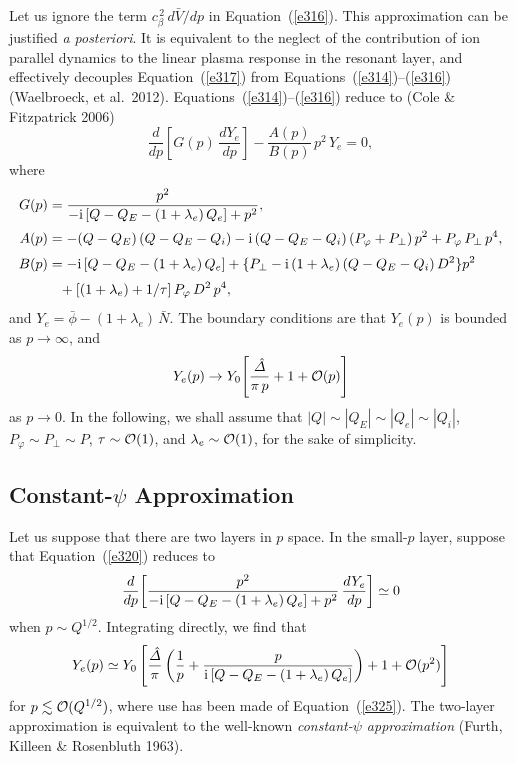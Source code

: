 \documentclass[notitlepage,12pt]{article}
\begin{document}
Let us ignore the term $c_\beta^{\,2}\,d\bar{V}/dp$ in Equation~(\ref{e316}). This approximation can
be justified {\em a posteriori}. It is equivalent to the neglect of the contribution of ion parallel dynamics to the linear  plasma
response in the resonant layer, and effectively decouples Equation~(\ref{e317}) from Equations~(\ref{e314})--(\ref{e316}) (Waelbroeck, et al.\ 2012). Equations~(\ref{e314})--(\ref{e316}) reduce to (Cole \& Fitzpatrick 2006)
\begin{equation}\label{e320}
\frac{d}{dp}\!\left[G(p)\,\frac{dY_e}{dp}\right] - \frac{A(p)}{B(p)}\,p^{2}\,Y_e = 0,
\end{equation}
where
\begin{align}
G(p)&= \frac{p^2}{-{\rm i}\,[Q-Q_E-(1+\lambda_e)\,Q_e] + p^2},\\[0.5ex]
 A(p) &= -(Q-Q_E)\,(Q-Q_E-Q_i)-{\rm i}\,(Q-Q_E-Q_i)\,(P_\varphi+P_\perp)\,p^2 + P_\varphi\,P_\perp\,p^4,\\[0.5ex]
 B(p) &= 
-{\rm i}\,[Q-Q_E-(1+\lambda_e)\,Q_e] +\{P_\perp - {\rm i}\,(1+\lambda_e)\,(Q-Q_E-Q_i)\,D^2\}p^2\nonumber\\[0.5ex]
&\phantom{=}+[(1+\lambda_e)+1/\tau]\,P_\varphi\,D^2\,p^4,
\end{align}
and $Y_e=\bar{\phi} - (1+\lambda_e)\,\bar{N}$. The boundary conditions are that $Y_e(p)$ is bounded as $p\rightarrow\infty$, and
\begin{equation}\label{e325}
Y_e(p)\rightarrow Y_0\!\left[\frac{\hat{\mit\Delta}}{\pi\,p} + 1+ {\cal O}(p)\right]
\end{equation}
as $p\rightarrow 0$. In the following, we shall assume that $|Q|\sim |Q_E|\sim |Q_e|\sim |Q_i|$, $P_\varphi\sim P_\perp \sim P$, $\tau\sim {\cal O}(1)$, and $\lambda_e\sim{\cal O}(1)$,  for the
sake of simplicity. 

\subsection{Constant-$\psi$ Approximation}\label{s5.6}
Let us suppose that there are two layers in $p$ space. In the small-$p$ layer, suppose that Equation~(\ref{e320}) reduces to
\begin{equation}
\frac{d}{dp}\!\left[\frac{p^2}{-{\rm i}\,[Q-Q_E-(1+\lambda_e)\,Q_e] + p^2}\,\frac{dY_e}{dp}\right]\simeq 0
\end{equation}
when $p\sim Q^{1/2}$. Integrating directly, we find that
\begin{equation}
Y_e(p) \simeq Y_0 \left[\frac{\hat{\mit\Delta}}{\pi}\left(\frac{1}{p} + \frac{p}{{\rm i}\,[Q-Q_E-(1+\lambda_e)\,Q_e]}\right) + 1 + {\cal O}(p^2)\right]
\end{equation}
for $p\lesssim {\cal O}(Q^{1/2})$, where use has been made of Equation~(\ref{e325}). The two-layer  approximation is
equivalent to the well-known {\em constant-$\psi$ approximation}\/ (Furth, Killeen \& Rosenbluth 1963).
\end{document}
